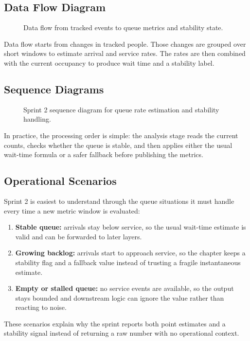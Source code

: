 \subsection{Data Flow Diagram}
\begin{figure}[H]
    \centering
    \caption{Data flow from tracked events to queue metrics and stability state.}
    \label{fig:sprint2_data_flow}
\end{figure}

Data flow starts from changes in tracked people. Those changes are grouped over short windows to estimate arrival and service rates. The rates are then combined with the current occupancy to produce wait time and a stability label.

\subsection{Sequence Diagrams}
\begin{figure}[H]
    \centering
    \caption{Sprint 2 sequence diagram for queue rate estimation and stability handling.}
    \label{fig:sprint2_sequence}
\end{figure}

In practice, the processing order is simple: the analysis stage reads the current counts, checks whether the queue is stable, and then applies either the usual wait-time formula or a safer fallback before publishing the metrics.

\subsection{Operational Scenarios}
Sprint 2 is easiest to understand through the queue situations it must handle every time a new metric window is evaluated:
\begin{enumerate}
    \item \textbf{Stable queue:} arrivals stay below service, so the usual wait-time estimate is valid and can be forwarded to later layers.
    \item \textbf{Growing backlog:} arrivals start to approach service, so the chapter keeps a stability flag and a fallback value instead of trusting a fragile instantaneous estimate.
    \item \textbf{Empty or stalled queue:} no service events are available, so the output stays bounded and downstream logic can ignore the value rather than reacting to noise.
\end{enumerate}
These scenarios explain why the sprint reports both point estimates and a stability signal instead of returning a raw number with no operational context.

